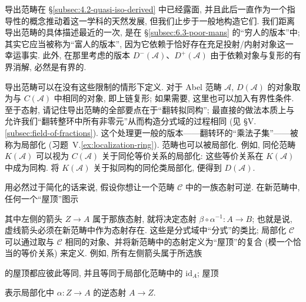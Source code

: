导出范畴在 \S\ref{subsec:4.2-quasi-iso-derived} 中已经露面, 并且此后一直作为一个指导性的概念推动着这一学科的天然发展, 但我们止步于一般地构造它们. 我们距离导出范畴的具体描述最近的一次, 是在 \S\ref{subsec:6.3-poor-mans} 的“穷人的版本”中; 其实它应当被称为“富人的版本”, 因为它依赖于恰好存在充足投射/内射对象这一幸运事实. 此外, 在那里考虑的版本 $D^-(\mathcal{A})$、$D^+(\mathcal{A})$ 由于依赖对象与复形的有界消解, 必然是有界的.

导出范畴可以在没有这些限制的情形下定义. 对于 Abel 范畴 $\mathcal{A}$, $D(\mathcal{A})$ 的对象取为与 $C(\mathcal{A})$ 中相同的对象, 即上链复形; 如果需要, 这里也可以加入有界性条件. 至于态射, 请记住导出范畴的全部要点在于“翻转拟同构”; 最直接的做法本质上与允许我们“翻转整环中所有非零元”从而构造分式域的过程相同 (见 §V.\ref{subsec:field-of-fractions}). 这个处理更一般的版本——翻转环的“乘法子集”——被称为局部化 (习题~V.\ref{ex:localization-ring}). 范畴也可以被局部化. 例如, 同伦范畴 $K(\mathcal{A})$ 可以视为 $C(\mathcal{A})$ 关于同伦等价关系的局部化: 这些等价关系在 $K(\mathcal{A})$ 中成为同构. 将 $K(\mathcal{A})$ 关于拟同构的同伦类局部化, 便得到 $D(\mathcal{A})$.

用必然过于简化的话来说, 假设你想让一个范畴 $\mathcal{C}$ 中的一族态射可逆. 在新范畴中, 任何一个“屋顶”图示
\begin{center}
\end{center}
其中左侧的箭头 $Z\to A$ 属于那族态射, 就将决定态射 $\beta\circ\alpha^{-1}:A\to B$; 也就是说, 虚线箭头必须在新范畴中作为态射存在. 这些是分式域中“分式”的类比; 局部化 $\mathcal{C}$ 可以通过取与 $\mathcal{C}$ 相同的对象、并将新范畴中的态射定义为“屋顶”的复合 (模一个恰当的等价关系) 来定义. 例如, 所有左侧箭头属于所选族
\begin{center}
\end{center}
的屋顶都应彼此等同, 并且等同于局部化范畴中的 $\mathrm{id}_A$; 屋顶
\begin{center}
\end{center}
表示局部化中 $\alpha:Z\to A$ 的逆态射 $A\to Z$.

